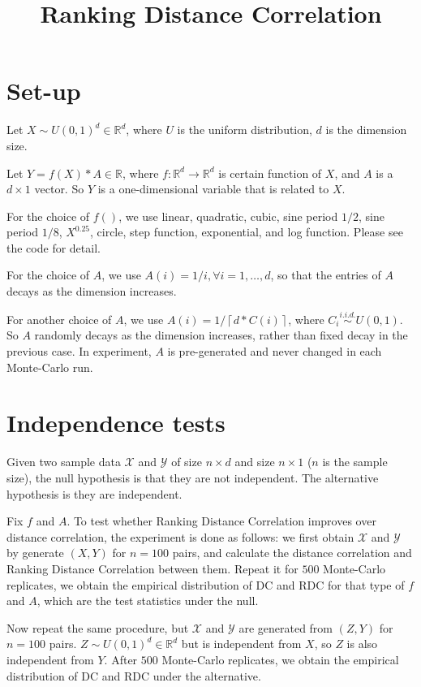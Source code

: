 \documentclass[review]{elsarticle}
\begin{document}
\begin{frontmatter}
\title{Ranking Distance Correlation}

\end{frontmatter}

\section{Set-up}
Let $X \sim U(0,1)^{d} \in \mathbb{R}^{d}$, where $U$ is the uniform distribution, $d$ is the dimension size. 

Let $Y=f(X) * A \in \mathbb{R}$, where $f: \mathbb{R}^{d} \rightarrow \mathbb{R}^{d}$ is certain function of $X$, and $A$ is a $d \times 1$ vector. So $Y$ is a one-dimensional variable that is related to $X$.

For the choice of $f()$, we use linear, quadratic, cubic, sine period $1/2$, sine period $1/8$, $X^{0.25}$, circle, step function, exponential, and log function. Please see the code for detail. 

For the choice of $A$, we use $A(i)=1/i, \forall i=1,\ldots,d$, so that the entries of $A$ decays as the dimension increases. 

For another choice of $A$, we use $A(i)=1/ \left\lceil d * C(i) \right\rceil$, where $C_{i} \stackrel{i.i.d.}{\sim} U(0,1)$. So $A$ randomly decays as the dimension increases, rather than fixed decay in the previous case. In experiment, $A$ is pre-generated and never changed in each Monte-Carlo run.

\section{Independence tests}
Given two sample data $\mathcal{X}$ and $\mathcal{Y}$ of size $n \times d$ and size $n \times 1$ ($n$ is the sample size), the null hypothesis is that they are not independent. The alternative hypothesis is they are independent.

Fix $f$ and $A$. To test whether Ranking Distance Correlation improves over distance correlation, the experiment is done as follows: we first obtain $\mathcal{X}$ and $\mathcal{Y}$ by generate $(X,Y)$ for $n=100$ pairs, and calculate the distance correlation and Ranking Distance Correlation between them. Repeat it for $500$ Monte-Carlo replicates, we obtain the empirical distribution of DC and RDC for that type of $f$ and $A$, which are the test statistics under the null.

Now repeat the same procedure, but $\mathcal{X}$ and $\mathcal{Y}$ are generated from $(Z,Y)$ for $n=100$ pairs. $Z \sim U(0,1)^{d} \in \mathbb{R}^{d}$ but is independent from $X$, so $Z$ is also independent from $Y$. After $500$ Monte-Carlo replicates, we obtain the empirical distribution of DC and RDC under the alternative.
\end{document}

